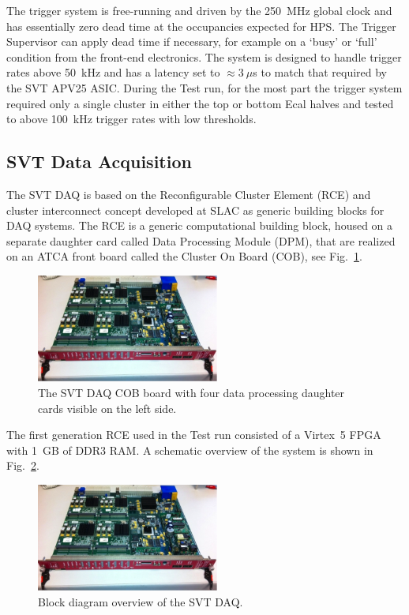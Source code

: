 \documentclass[final,3p,times,twocolumn]{elsarticle}
\begin{document}
The trigger system is free-running and driven by the 250~MHz global clock and has essentially zero 
dead time at the occupancies expected for HPS. The Trigger Supervisor can apply dead time if 
necessary, for example on a `busy' or `full' condition from the front-end electronics. The system is 
designed to handle trigger rates above 50~kHz and has a latency set to $\approx 3~\mu$s to match 
that required by the SVT APV25 ASIC. During the Test run, for the most part the trigger system 
required only a single cluster in either the top or bottom Ecal halves and tested to above 100~kHz 
trigger rates with low thresholds. 



\subsection{SVT Data Acquisition}
\label{sec:svt_daq}
The SVT DAQ is based on the Reconfigurable Cluster Element (RCE) and cluster 
interconnect concept developed at SLAC as generic building blocks for DAQ systems. 
The RCE is a generic computational building block, housed on a separate daughter card called 
Data Processing Module (DPM), that are realized on an ATCA front board called the Cluster On Board 
(COB), see Fig.~\ref{fig:cob}.
 \begin{figure}[]
\begin{center}
{\small
	\includegraphics[width=6cm]{figures/svt_daq_module}
	\caption{The SVT DAQ COB board with four data processing daughter cards visible on the left side.}
	\label{fig:cob}
}
\end{center}
\end{figure}
The first generation RCE used in the Test run consisted of a Virtex~5 FPGA with 1~GB of DDR3 RAM. 
A schematic overview of the system is shown in Fig.~\ref{fig:svtdaq}. 
 \begin{figure}[]
\begin{center}
{\small
	\includegraphics[width=6cm]{figures/svt_daq_module}
	\caption{Block diagram overview of the SVT DAQ.}
	\label{fig:svtdaq}
}
\end{center}
\end{figure}
\end{document}
